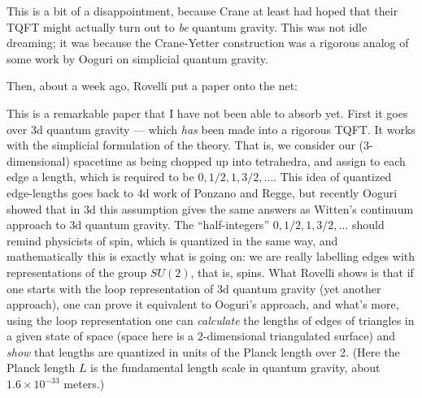 \documentclass{article}
\def\tightlist{}
\renewcommand{\texttt}[1]{%
  \begingroup
  \ttfamily
  \begingroup\lccode`~=`/\lowercase{\endgroup\def~}{/\discretionary{}{}{}}%
  \begingroup\lccode`~=`[\lowercase{\endgroup\def~}{[\discretionary{}{}{}}%
  \begingroup\lccode`~=`.\lowercase{\endgroup\def~}{.\discretionary{}{}{}}%
  \catcode`/=\active\catcode`[=\active\catcode`.=\active
  \scantokens{#1\noexpand}%
  \endgroup
}
\begin{document}
This is a bit of a disappointment, because Crane at least had hoped that
their TQFT might actually turn out to \emph{be} quantum gravity. This
was not idle dreaming; it was because the Crane-Yetter construction was
a rigorous analog of some work by Ooguri on simplicial quantum gravity.

Then, about a week ago, Rovelli put a paper onto the net:


This is a remarkable paper that I have not been able to absorb yet.
First it goes over 3d quantum gravity --- which \emph{has} been made
into a rigorous TQFT. It works with the simplicial formulation of the
theory. That is, we consider our (3-dimensional) spacetime as being
chopped up into tetrahedra, and assign to each edge a length, which is
required to be \(0,1/2,1,3/2,\ldots\). This idea of quantized
edge-lengths goes back to 4d work of Ponzano and Regge, but recently
Ooguri showed that in 3d this assumption gives the same answers as
Witten's continuum approach to 3d quantum gravity. The ``half-integers''
\(0,1/2,1,3/2,\ldots\) should remind physicists of spin, which is
quantized in the same way, and mathematically this is exactly what is
going on: we are really labelling edges with representations of the
group \(SU(2)\), that is, spins. What Rovelli shows is that if one
starts with the loop representation of 3d quantum gravity (yet another
approach), one can prove it equivalent to Ooguri's approach, and what's
more, using the loop representation one can \emph{calculate} the lengths
of edges of triangles in a given state of space (space here is a
2-dimensional triangulated surface) and \emph{show} that lengths are
quantized in units of the Planck length over 2. (Here the Planck length
\(L\) is the fundamental length scale in quantum gravity, about
\(1.6 \times 10^{-33}\) meters.)
\end{document}
